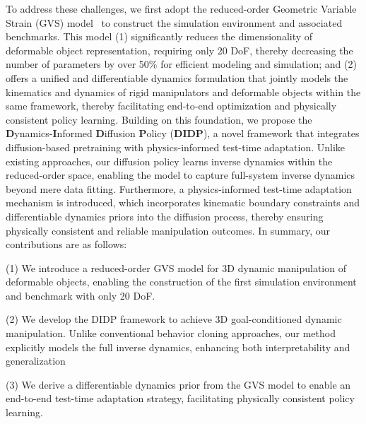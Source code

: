 \documentclass{article}
\begin{document}
To address these challenges, we first adopt the reduced-order Geometric Variable Strain (GVS) model~\cite{Anup2025reduced} to construct the simulation environment and associated benchmarks. This model (1) significantly reduces the dimensionality of deformable object representation, requiring only 20 DoF, thereby decreasing the number of parameters by over 50\% for efficient modeling and simulation; and (2) offers a unified and differentiable dynamics formulation that jointly models the kinematics and dynamics of rigid manipulators and deformable objects within the same framework, thereby facilitating end-to-end optimization and physically consistent policy learning.
Building on this foundation, we propose the \textbf{D}ynamics-\textbf{I}nformed \textbf{D}iffusion \textbf{P}olicy (\textbf{DIDP}), a novel framework that integrates diffusion-based pretraining with physics-informed test-time adaptation. Unlike existing approaches, our diffusion policy learns inverse dynamics within the reduced-order space, enabling the model to capture full-system inverse dynamics beyond mere data fitting. Furthermore, a physics-informed test-time adaptation mechanism is introduced, which incorporates kinematic boundary constraints and differentiable dynamics priors into the diffusion process, thereby ensuring physically consistent and reliable manipulation outcomes. In summary, our contributions are as follows:


(1) We introduce a reduced-order GVS model for 3D dynamic manipulation of deformable objects, enabling the construction of the first simulation environment and benchmark with only 20 DoF. %

(2) We develop the DIDP framework to achieve 3D goal-conditioned dynamic manipulation. Unlike conventional behavior cloning approaches, our method explicitly models the full inverse dynamics, enhancing both interpretability and generalization

(3) We derive a differentiable dynamics prior from the GVS model to enable an end-to-end test-time adaptation strategy, facilitating physically consistent policy learning.




\end{document}
